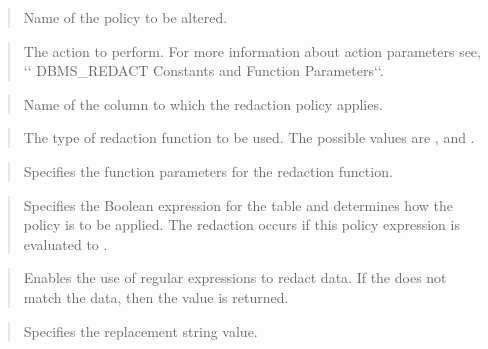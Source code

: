 \documentclass[letterpaper,10pt,english,openany,oneside]{sphinxmanual}
\begin{document}
\begin{quote}

Name of the policy to be altered.
\end{quote}

\begin{quote}

The action to perform. For more information about action parameters see,
{}`{}` DBMS\_REDACT Constants and Function Parameters{}`{}`.
\end{quote}

\begin{quote}

Name of the column to which the redaction policy applies.
\end{quote}

\begin{quote}

The type of redaction function to be used. The possible values are , and .
\end{quote}

\begin{quote}

Specifies the function parameters for the redaction function.
\end{quote}

\begin{quote}

Specifies the Boolean expression for the table and determines how the
policy is to be applied. The redaction occurs if this policy expression
is evaluated to .
\end{quote}

\newpage

\begin{quote}

Enables the use of regular expressions to redact data. If the
 does not match the data, then the  value is
returned.
\end{quote}

\begin{quote}

Specifies the replacement string value.
\end{quote}
\end{document}
